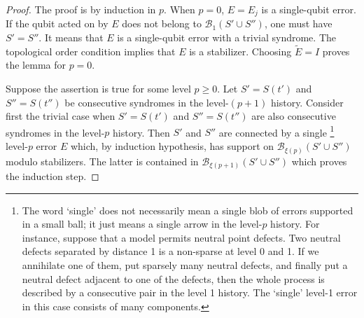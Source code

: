 \begin{proof}
The proof is by induction in $p$.
When $p=0$, $E=E_j$ is a single-qubit error.
If the qubit acted on by $E$ does
not belong to $\mathcal B_{1}(S'\cup S'')$, one must have $S'=S''$.
It means that $E$ is a single-qubit error with a trivial syndrome.
The topological order condition implies that $E$ is a stabilizer.
Choosing $\tilde{E}=I$ proves the lemma for $p=0$.

Suppose the assertion is true for some level $p \ge 0$.
Let $S'=S(t')$ and $S''=S(t'')$ be consecutive syndromes in the level-$(p+1)$
history. Consider first the trivial case when
$S'=S(t')$ and $S''=S(t'')$ are also consecutive syndromes in the level-$p$ history.
Then $S'$ and $S''$ are connected by a single%
\footnote{%
The word `single' does not necessarily mean a single blob of errors supported in a small ball; 
it just means a single arrow in the level-$p$ history.
For instance, suppose that a model permits neutral point defects.
Two neutral defects separated by distance 1 is a non-sparse at level 0 and 1.
If we annihilate one of them, put sparsely many neutral defects,
and finally put a neutral defect adjacent to one of the defects,
then the whole process is described by a consecutive pair in the level 1 history.
The `single' level-1 error in this case consists of many components.%
}
level-$p$ error $E$ which, by induction hypothesis, has support on $\mathcal B _{\xi(p)}(S'\cup S'')$
modulo stabilizers.
The latter is contained in $\mathcal B_{\xi(p+1)}(S'\cup S'')$ which proves the induction step.


\end{proof}
